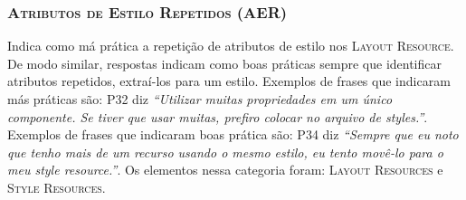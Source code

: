 \subsubsection{\textsc{Atributos de Estilo Repetidos (AER)}}
Indica como má prática a repetição de atributos de estilo nos \textsc{Layout Resource}. De modo similar, respostas indicam como boas práticas sempre que identificar atributos repetidos, extraí-los para um estilo. Exemplos de frases que indicaram más práticas são: P32 diz \textit{``Utilizar muitas propriedades em um único componente. Se tiver que usar muitas, prefiro colocar no arquivo de styles.''}. Exemplos de frases que indicaram boas prática são: P34 diz \textit{``Sempre que eu noto que tenho mais de um recurso usando o mesmo estilo, eu tento movê-lo para o meu \textit{style resource}.''}. Os elementos nessa categoria foram: \textsc{Layout Resources} e \textsc{Style Resources}.






